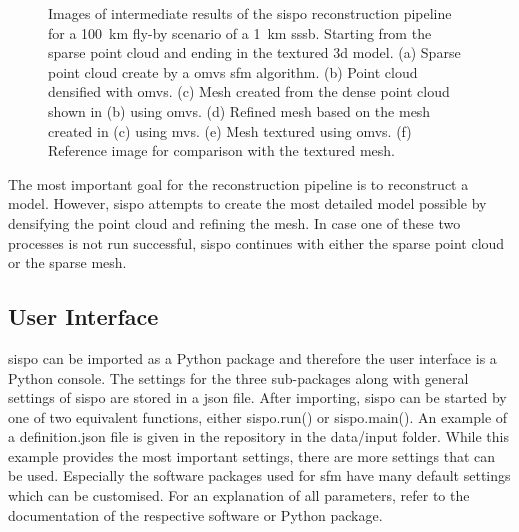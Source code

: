 \begin{figure}[htb]
\begin{subfigure}[b]{0.46\textwidth}
        \caption{}
        \label{fig:recon_step_img}
    \end{subfigure}
    \caption{Images of intermediate results of the \gls{sispo} reconstruction pipeline for a \SI{100}{\kilo\meter} fly-by scenario of a \SI{1}{\kilo\meter} \gls{sssb}. Starting from the sparse point cloud and ending in the textured \gls{3d} model. (a) Sparse point cloud create by a \gls{omvs} \gls{sfm} algorithm. (b) Point cloud densified with \gls{omvs}. (c) Mesh created from the dense point cloud shown in (b) using \gls{omvs}. (d) Refined mesh based on the mesh created in (c) using \gls{mvs}. (e) Mesh textured using \gls{omvs}. (f) Reference image for comparison with the textured mesh.}
    \label{fig:recon_steps}
\end{figure}

The most important goal for the reconstruction pipeline is to reconstruct a model. However, \gls{sispo} attempts to create the most detailed model possible by densifying the point cloud and refining the mesh. In case one of these two processes is not run successful, \gls{sispo} continues with either the sparse point cloud or the sparse mesh.

\subsection{User Interface}
\Gls{sispo} can be imported as a Python package and therefore the user interface is a Python console. The settings for the three sub-packages along with general settings of \gls{sispo} are stored in a \gls{json} file. After importing, \gls{sispo} can be started by one of two equivalent functions, either sispo.run() or sispo.main(). An example of a definition.json file is given in the repository in the data/input folder. While this example provides the most important settings, there are more settings that can be used. Especially the software packages used for \gls{sfm} have many default settings which can be customised. For an explanation of all parameters, refer to the documentation of the respective software or Python package.

